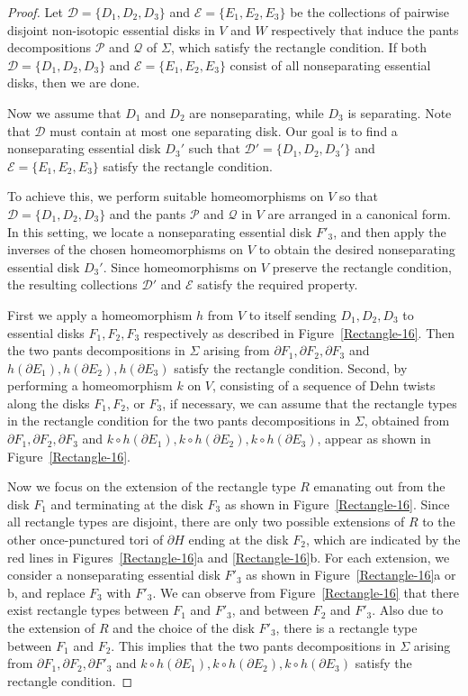\documentclass[12pt]{amsart}
\begin{document}
\begin{proof}
Let $\mathcal{D}=\{D_1, D_2, D_3\}$ and $\mathcal{E}=\{E_1, E_2, E_3\}$ be the collections of pairwise disjoint non-isotopic essential disks in $V$ and $W$ respectively that induce the pants decompositions $\mathcal{P}$ and $\mathcal{Q}$ of $\Sigma$, which satisfy the rectangle condition.
If both $\mathcal{D}=\{D_1, D_2, D_3\}$ and $\mathcal{E}=\{E_1, E_2, E_3\}$ consist of all nonseparating essential disks, then we are done.

Now we assume that $D_1$ and $D_2$ are nonseparating, while $D_3$ is separating. Note that $\mathcal{D}$ must contain at most one separating disk.
Our goal is to find a nonseparating essential disk
$D_3'$ such that $\mathcal{D}'=\{D_1, D_2, D_3'\}$ and $\mathcal{E}=\{E_1, E_2, E_3\}$ satisfy the rectangle condition.

To achieve this, we perform suitable homeomorphisms on $V$ so that $\mathcal{D}=\{D_1, D_2, D_3\}$ and the pants $\mathcal{P}$ and $\mathcal{Q}$ in $V$
are arranged in a canonical form. In this setting, we locate a nonseparating essential disk
$F'_3$, and then apply the inverses of the chosen homeomorphisms on $V$ to obtain the desired nonseparating essential disk $D_3'$.
Since homeomorphisms on $V$ preserve the rectangle condition, the resulting
collections $\mathcal{D}'$ and $\mathcal{E}$ satisfy the required property.


First we apply a homeomorphism $h$ from $V$ to itself
sending $D_1, D_2, D_3$ to essential disks $F_1, F_2, F_3$ respectively as described in Figure~\ref{Rectangle-16}. Then the two pants decompositions in $\Sigma$ arising from $\partial F_1, \partial F_2, \partial F_3$ and $h(\partial E_1), h(\partial E_2), h(\partial E_3)$ satisfy the rectangle condition. Second, by performing a homeomorphism $k$ on $V$, consisting of a sequence of Dehn twists along the disks $F_1, F_2$, or $F_3$, if necessary, we can assume that the rectangle types in the rectangle condition for the two pants decompositions in $\Sigma$, obtained from $\partial F_1, \partial F_2, \partial F_3$ and $k\circ h(\partial E_1), k\circ h(\partial E_2), k\circ h(\partial E_3)$, appear as shown in Figure~\ref{Rectangle-16}.


Now we focus on the extension of the rectangle type $R$ emanating out from the disk $F_1$ and terminating at the disk $F_3$ as shown in Figure~\ref{Rectangle-16}. Since all rectangle types are disjoint, there are only two possible extensions of $R$ to the other once-punctured tori of $\partial H$ ending at the disk $F_2$, which are indicated by the red lines in Figures~\ref{Rectangle-16}a and \ref{Rectangle-16}b. For each extension, we consider a nonseparating essential disk $F'_3$ as shown in Figure~\ref{Rectangle-16}a or b, and replace $F_3$ with $F'_3$. We can observe from Figure~\ref{Rectangle-16} that there exist rectangle types between $F_1$ and $F'_3$, and between $F_2$ and $F'_3$. Also due to the extension of $R$ and the choice of the disk $F'_3$, there is a rectangle type between $F_1$ and $F_2$. This implies that the two pants decompositions in $\Sigma$ arising from $\partial F_1, \partial F_2, \partial F'_3$ and $k\circ h(\partial E_1), k\circ h(\partial E_2), k\circ h(\partial E_3)$ satisfy the rectangle condition.


\end{proof}
\end{document}
